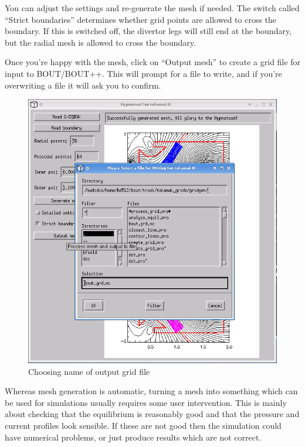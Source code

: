 \documentclass[12pt, a4paper]{article}
\begin{document}
You can adjust the settings and re-generate the mesh if needed. The switch
called ``Strict boundaries'' determines whether grid points are allowed to
cross the boundary. If this is switched off, the divertor legs will still end
at the boundary, but the radial mesh is allowed to cross the boundary.

\clearpage

Once you're happy with the mesh, click on ``Output mesh'' to create a
grid file for input to BOUT/BOUT++. This will prompt for a file to write,
and if you're overwriting a file it will ask you to confirm. 
\begin{figure}[h!]
  \centering
  \includegraphics[width=0.5\paperwidth, keepaspectratio]{screen_5.png}
  \caption{Choosing name of output grid file}
  \label{fig:screen_5}
\end{figure}

Whereas mesh generation is automatic, turning a mesh into something which
can be used for simulations usually requires some user intervention. This
is mainly about checking that the equilibrium is reasonably good and that
the pressure and current profiles look sensible. If these are not good then
the simulation could have numerical problems, or just produce results which
are not correct.
\end{document}
